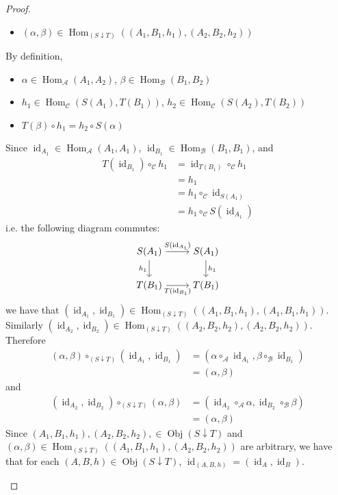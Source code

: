 \documentclass[12pt]{amsart}
\theoremstyle{definition}
\newcommand{\al}{\alpha}
\newcommand{\be}{\beta}
\newcommand{\MA}{\mathcal{A}}
\newcommand{\MB}{\mathcal{B}}
\newcommand{\MC}{\mathcal{C}}
\DeclareMathOperator{\id}{id}
\DeclareMathOperator{\Obj}{Obj}
\DeclareMathOperator{\Hom}{Hom}
\DeclareMathOperator*{\0}{\mbf{0}}
\DeclareMathOperator*{\1}{\mbf{1}}
\begin{document}
\begin{proof}
\begin{itemize}
\begin{itemize}
				\item $(\al, \be) \in \Hom_{(S \downarrow T)}((A_1, B_1, h_1), (A_2, B_2, h_2))$ 
			\end{itemize}
			By definition, 
			\begin{itemize}
				\item $\al \in \Hom_{\MA}(A_1, A_2)$, $\be \in \Hom_{\MB}(B_1, B_2)$
				\item $h_1 \in \Hom_{\MC}(S(A_1), T(B_1))$, $h_2 \in \Hom_{\MC}(S(A_2), T(B_2))$ 
				\item $T(\be) \circ h_1 = h_2 \circ S(\al)$
			\end{itemize}
			Since $\id_{A_1} \in \Hom_{\MA}(A_1, A_1)$, $\id_{B_1} \in \Hom_{\MB}(B_1, B_1)$, and
			\begin{align*}
				T(\id_{B_1}) \circ_{\MC}  h_1 
				& = \id_{T(B_1)} \circ_{\MC} h_1 \\
				& = h_1 \\
				& = h_1 \circ_{\MC} \id_{S(A_1)} \\
				& = h_1 \circ_{\MC} S(\id_{A_1}) 
			\end{align*}
			i.e. the following diagram commutes:
			\[
			\begin{tikzcd}
				S(A_1) \arrow[r, "S(\id_{A_1})"] \arrow[d, "h_1"']  & S(A_1)  \arrow[d, "h_1"] \\
				T(B_1) \arrow[r, "T(\id_{B_1})"']                   & T(B_1)
			\end{tikzcd}
			\]
			we have that $(\id_{A_1}, \id_{B_1}) \in \Hom_{(S \downarrow T)}((A_1, B_1, h_1), (A_1, B_1, h_1))$. Similarly $(\id_{A_2}, \id_{B_2}) \in \Hom_{(S \downarrow T)}((A_2, B_2, h_2), (A_2, B_2, h_2))$. Therefore
			\begin{align*}
				(\al, \be) \circ_{(S \downarrow T)} (\id_{A_1}, \id_{B_1}) 
				& = (\al \circ_{\MA} \id_{A_1}, \be \circ_{\MB} \id_{B_1}) \\
				& = (\al, \be)
			\end{align*}
			and 
			\begin{align*}
				(\id_{A_2}, \id_{B_2}) \circ_{(S\downarrow T)} (\al, \be) 
				& = (\id_{A_2} \circ_{\MA} \al ,  \id_{B_2} \circ_{\MB} \be ) \\
				& = (\al, \be)
			\end{align*}
			Since $(A_1, B_1, h_1), (A_2, B_2, h_2), \in \Obj(S \downarrow T)$ and\\ $(\al, \be) \in \Hom_{(S \downarrow T)}((A_1, B_1, h_1), (A_2, B_2, h_2))$ are arbitrary, we have that for each $(A, B, h) \in \Obj(S \downarrow T)$, $\id_{(A, B, h)} = (\id_A, \id_B)$.
		\end{itemize}
	\end{proof}
\end{document}
